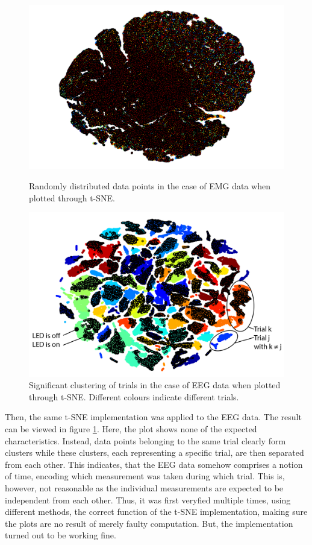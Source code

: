 \documentclass{article} %
\begin{document}
\begin{figure}
	\centering
	\begin{minipage}{0.5\textwidth}
		\centering
		\includegraphics[width=1.0\textwidth]{images/emg_tsne.png}
		\caption{Randomly distributed data points in the case of EMG data when plotted through t-SNE.}
		\label{fig:emg_tsne}
	\end{minipage}\hfill
	\begin{minipage}{0.49\textwidth}
		\centering
		\includegraphics[width=1.0\textwidth]{images/eeg_tsne.png}
		\caption{Significant clustering of trials in the case of EEG data when plotted through t-SNE. Different colours indicate different trials.}
		\label{fig:eeg_tsne}
	\end{minipage}
\end{figure}

Then, the same t-SNE implementation was applied to the EEG data. The result can be viewed in figure \ref{fig:eeg_tsne}. Here, the plot shows none of the expected characteristics. Instead, data points belonging to the same trial clearly form clusters while these clusters, each representing a specific trial, are then separated from each other. This indicates, that the EEG data somehow comprises a notion of time, encoding which measurement was taken during which trial. This is, however, not reasonable as the individual measurements are expected to be independent from each other. Thus, it was first veryfied multiple times, using different methods, the correct function of the t-SNE implementation, making sure the plots are no result of merely faulty computation. But, the implementation turned out to be working fine.
\end{document}
